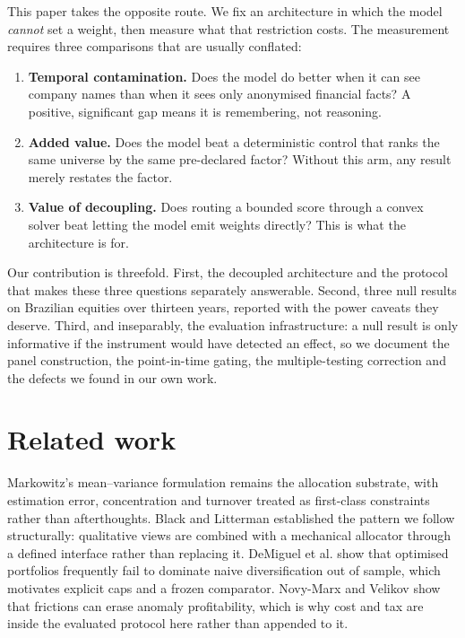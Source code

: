 \documentclass[10pt,conference]{IEEEtran}
\begin{document}
This paper takes the opposite route. We fix an architecture in which the model \emph{cannot} set a weight, then measure what that restriction costs. The measurement requires three comparisons that are usually conflated:

\begin{enumerate}
\item \textbf{Temporal contamination.} Does the model do better when it can see company names than when it sees only anonymised financial facts? A positive, significant gap means it is remembering, not reasoning.
\item \textbf{Added value.} Does the model beat a deterministic control that ranks the same universe by the same pre-declared factor? Without this arm, any result merely restates the factor.
\item \textbf{Value of decoupling.} Does routing a bounded score through a convex solver beat letting the model emit weights directly? This is what the architecture is for.
\end{enumerate}

Our contribution is threefold. First, the decoupled architecture and the protocol that makes these three questions separately answerable. Second, three null results on Brazilian equities over thirteen years, reported with the power caveats they deserve. Third, and inseparably, the evaluation infrastructure: a null result is only informative if the instrument would have detected an effect, so we document the panel construction, the point-in-time gating, the multiple-testing correction and the defects we found in our own work.

\section{Related work}

Markowitz's mean--variance formulation \cite{markowitz} remains the allocation substrate, with estimation error, concentration and turnover treated as first-class constraints rather than afterthoughts. Black and Litterman \cite{blacklitterman} established the pattern we follow structurally: qualitative views are combined with a mechanical allocator through a defined interface rather than replacing it. DeMiguel et al. \cite{demiguel} show that optimised portfolios frequently fail to dominate naive diversification out of sample, which motivates explicit caps and a frozen comparator. Novy-Marx and Velikov \cite{novymarx} show that frictions can erase anomaly profitability, which is why cost and tax are inside the evaluated protocol here rather than appended to it.
\end{document}
